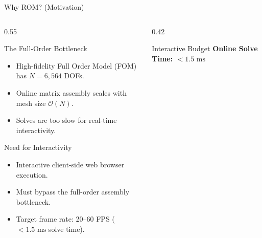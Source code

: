 
\begin{frame}{Why ROM? (Motivation)}
  \small
  \begin{columns}[T]
    \begin{column}{0.55\textwidth}
      \begin{block}{The Full-Order Bottleneck}
        \begin{itemize}
          \item High-fidelity Full Order Model (FOM) has $N = 6,564$ DOFs.
          \item Online matrix assembly scales with mesh size $\mathcal{O}(N)$.
          \item Solves are too slow for real-time interactivity.
        \end{itemize}
      \end{block}
      \vspace{0.1cm}
      \begin{block}{Need for Interactivity}
        \begin{itemize}
          \item Interactive client-side web browser execution.
          \item Must bypass the full-order assembly bottleneck.
          \item Target frame rate: 20--60 FPS ($<1.5\text{ ms}$ solve time).
        \end{itemize}
      \end{block}
    \end{column}
    \begin{column}{0.42\textwidth}
      \centering
      \begin{alertblock}{Interactive Budget}
        \centering
        \bfseries
        Online Solve Time: \Large $< 1.5\text{ ms}$
      \end{alertblock}
      
      \vspace{0.25cm}
      \centering
\end{column}
\end{columns}
\end{frame}

